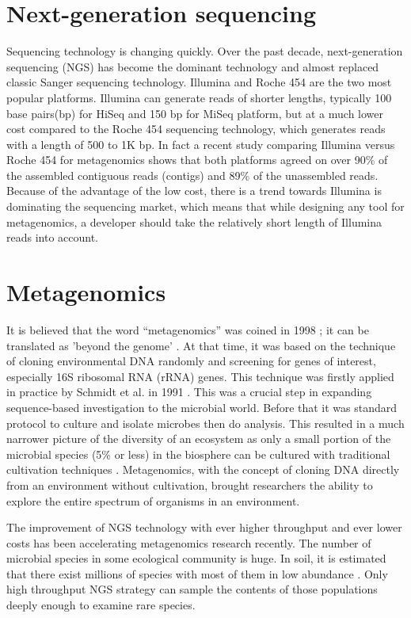 \section{Next-generation sequencing}
Sequencing technology is changing quickly. Over the past decade, next-generation sequencing (NGS)
 has become the dominant technology and almost replaced classic Sanger sequencing technology. 
 Illumina and Roche 454 are the two most popular platforms. Illumina can generate reads of shorter
 lengths, typically 100 base pairs(bp) for HiSeq and 150 bp for MiSeq platform\cite{Qin:2010aa, Mason:2012aa},   %
 but at a much lower cost compared to the Roche 454 sequencing technology, 
 which generates reads with a length of 500 to 1K bp. In fact a recent study comparing Illumina versus Roche 454 for metagenomics
 shows that both platforms agreed on over 90\% of the assembled contiguous reads (contigs) and 89\% of the unassembled reads\cite{Luo:2012aa}.
Because of the advantage of the low cost, there is a trend towards Illumina is dominating the sequencing market, which 
means that while designing any tool for metagenomics, a developer should take the relatively short length of Illumina reads
 into account.


\section{Metagenomics}
It is believed that the word ``metagenomics'' was coined in 1998 \cite{Handelsman:1998aa};
it can be translated as 'beyond the genome' \cite{Gilbert:2011aa}. At that time, 
 it was based on the technique of cloning environmental DNA randomly and screening for genes of interest, 
 especially 16S ribosomal RNA (rRNA) genes. This technique was firstly applied in practice by Schmidt et al. in 1991 \cite{Schmidt:1991aa}.
 This was a crucial step in expanding sequence-based investigation to the microbial world. Before that it was standard 
 protocol to culture and isolate microbes 
 then do analysis. This resulted in a much narrower picture of the diversity of an ecosystem as only a
 small portion of the microbial species (5\% or less) in the biosphere can be cultured with traditional cultivation techniques \cite{Sogin:2006aa}.
 Metagenomics, with the concept of cloning DNA directly from an environment without cultivation,
 brought researchers the ability to explore the entire spectrum of organisms in an environment.
 
The improvement of NGS technology with ever higher throughput and ever lower costs has been accelerating
metagenomics research recently. %
The number of microbial species in some ecological community is huge. 
In soil, it is estimated that there exist millions of species with most of them in low abundance \cite{Gans:2005aa}. 
Only high throughput NGS strategy can sample the contents of those populations deeply enough
to examine rare species.


